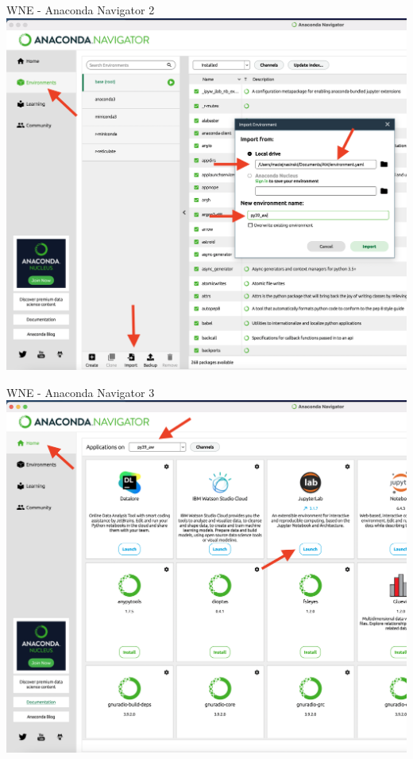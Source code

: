 \documentclass{beamer}
\begin{document}
\begin{frame}{WNE - Anaconda Navigator 2}
  \includegraphics[scale = 0.20]{anaconda_navigator_2.png}
\end{frame}

\begin{frame}{WNE - Anaconda Navigator 3}
  \includegraphics[scale = 0.20]{anaconda_navigator_3.png}
\end{frame}
\end{document}
